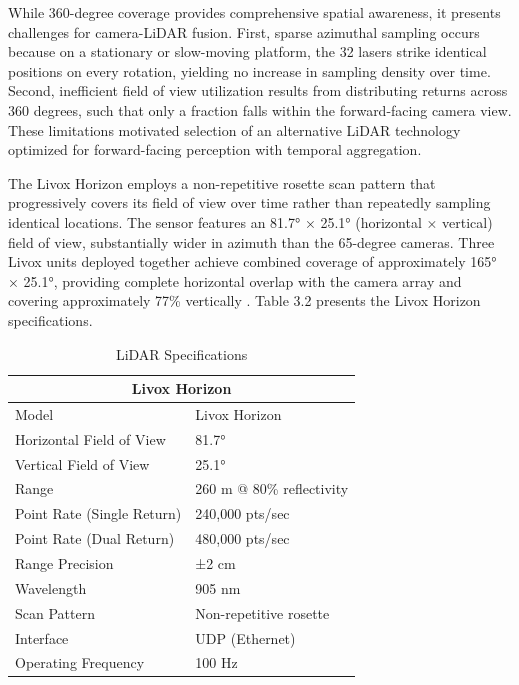 \documentclass{erauthesis}
\begin{document}
While 360-degree coverage provides comprehensive spatial awareness, it presents challenges for camera-\ac{LiDAR} fusion.
First, sparse azimuthal sampling occurs because on a stationary or slow-moving platform, the 32 lasers strike identical positions on every rotation, yielding no increase in sampling density over time.
Second, inefficient field of view utilization results from distributing returns across 360 degrees, such that only a fraction falls within the forward-facing camera view.
These limitations motivated selection of an alternative \ac{LiDAR} technology optimized for forward-facing perception with temporal aggregation.

The Livox Horizon employs a non-repetitive rosette scan pattern that progressively covers its field of view over time rather than repeatedly sampling identical locations.
The sensor features an 81.7° × 25.1° (horizontal × vertical) field of view, substantially wider in azimuth than the 65-degree cameras.
Three Livox units deployed together achieve combined coverage of approximately 165° × 25.1°, providing complete horizontal overlap with the camera array and covering approximately 77\% vertically \cite{thompson2023}.
Table 3.2 presents the Livox Horizon specifications.

\begin{table}[h]
\centering
\caption{LiDAR Specifications}
\begin{tabular}{ll}
\hline
\multicolumn{2}{c}{Livox Horizon}\\
\hline
\hline
Model & Livox Horizon \\
Horizontal Field of View & 81.7° \\
Vertical Field of View & 25.1° \\
Range & 260 m @ 80\% reflectivity \\
Point Rate (Single Return) & 240,000 pts/sec \\
Point Rate (Dual Return) & 480,000 pts/sec \\
Range Precision & ±2 cm \\
Wavelength & 905 nm \\
Scan Pattern & Non-repetitive rosette \\
Interface & UDP (Ethernet) \\
Operating Frequency & 100 Hz \\
\hline
\end{tabular}
\label{tab:livox_horizon_specs}
\end{table}
\end{document}
